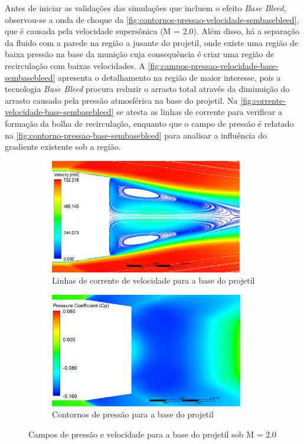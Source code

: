 Antes de iniciar as validações das simulações que incluem o efeito \textit{Base Bleed}, observou-se a onda de choque da \autoref{fig:contornos-pressao-velocidade-sembasebleed}, que é causada pela velocidade supersônica (M = \num{2,0}). Além disso, há a separação da fluido com a parede na região a jusante do projetil, onde existe uma região de baixa pressão na base da munição cuja consequência é criar uma região de recirculação com baixas velocidades. A \autoref{fig:campos-pressao-velocidade-base-sembasebleed} apresenta o detalhamento na região de maior interesse, pois a tecnologia \textit{Base Bleed} procura reduzir o arrasto total através da diminuição do arrasto causado pela pressão atmosférica na base do projetil. Na \autoref{fig:corrente-velocidade-base-sembasebleed} se atesta as linhas de corrente para verificar a formação da bolha de recirculação, enquanto que o campo de pressão é relatado na \autoref{fig:contorno-pressao-base-sembasebleed} para analisar a influência do gradiente existente sob a região.

\begin{figure}[!htpb]
    \centering
    \begin{subfigure}[b]{0.47\textwidth}
        \centering
        \includegraphics[height=5cm,width=\textwidth]{corrente-velocidade-off.png}
        \caption{Linhas de corrente de velocidade para a base do projetil}
        \label{fig:corrente-velocidade-base-sembasebleed}    
    \end{subfigure}
    \hfill
    \begin{subfigure}[b]{0.47\textwidth}
        \centering    
        \includegraphics[height=5cm,width=\textwidth]{coeficientepressao-INERTE.png}
        \caption{Contornos de pressão para a base do projetil}
        \label{fig:contorno-pressao-base-sembasebleed}
    \end{subfigure}
    \caption{Campos de pressão e velocidade para a base do projetil sob M = \num{2,0}}
    \label{fig:campos-pressao-velocidade-base-sembasebleed}
\end{figure}

